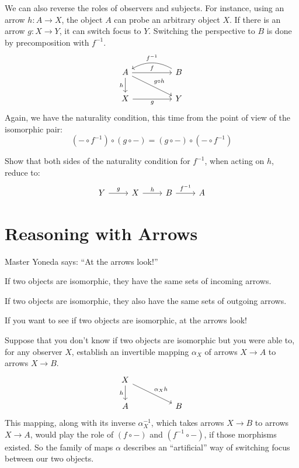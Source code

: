 \documentclass[DaoFP]{subfiles}
\begin{document}
We can also reverse the roles of observers and subjects. For instance, using an arrow $h \colon A \to X$, the object $A$ can probe an arbitrary object $X$. If there is an arrow $g \colon X \to Y$, it can switch focus to $Y$. Switching the perspective to $B$ is done by precomposition with $f^{-1}$.
\[
 \begin{tikzcd}
 A
 \arrow[rr, "f"]
 \arrow[d, "h"']
 \arrow[rrd, "g\circ h"]
 && B
  \arrow[ll, bend right,  "f^{-1}"']
 \\
 X
 \arrow[rr, "g"']
  && Y
 \end{tikzcd}
\]
Again, we have the naturality condition, this time from the point of view of the isomorphic pair:
\[(- \circ f^{-1}) \circ (g \circ -) = (g \circ -) \circ (- \circ f^{-1}) \]

\begin{exercise}
Show that both sides of the naturality condition for $f^{-1}$, when acting on $h$, reduce to:
\[
 \begin{tikzcd}
 Y \arrow[r, "g"] &X \arrow[r, "h"] & B \arrow[r, "f^{-1}"] & A
\end{tikzcd}
\]

\end{exercise}

\section{Reasoning with Arrows}

Master Yoneda says: ``At the arrows look!''

If two objects are isomorphic, they have the same sets of incoming arrows. 

If two objects are isomorphic, they also have the same sets of outgoing arrows.

If you want to see if two objects are isomorphic, at the arrows look!

\medskip

Suppose that you don't know if two objects are isomorphic but you were able to, for any observer $X$, establish an invertible mapping $\alpha_X$ of arrows $X \to A$ to arrows $X \to B$. 
\[
 \begin{tikzcd}
 X
 \arrow[d, "h"']
 \arrow[rrd, "\alpha_X h"]
  \\
 A
  && B
 \end{tikzcd}
\]
This mapping, along with its inverse $\alpha^{-1}_X$, which takes arrows $X \to B$ to arrows $X \to A$, would play the role of $(f \circ -)$ and $(f^{-1} \circ -)$, if those morphisms existed. So the family of maps $\alpha$ describes an ``artificial'' way of switching focus between our two objects.
\end{document}
